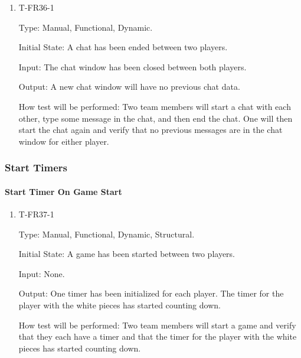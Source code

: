 \documentclass[12pt, titlepage]{article}
\begin{document}
        \begin{enumerate}

        \item{T-FR36-1\\}

            Type: Manual, Functional, Dynamic.
            					
            Initial State: A chat has been ended between two players.
            					
            Input: The chat window has been closed between both players.
            					
            Output: A new chat window will have no previous chat data.

            How test will be performed: Two team members will start a chat with each other, type some message in the chat, and then end the chat. One will then start the chat again and verify that no previous messages are in the chat window for either player.

        \end{enumerate}

\subsubsection{Start Timers}
		
    \paragraph{Start Timer On Game Start}

        \begin{enumerate}

        \item{T-FR37-1\\}

            Type: Manual, Functional, Dynamic, Structural.
            					
            Initial State: A game has been started between two players.
            					
            Input: None.
            					
            Output: One timer has been initialized for each player. The timer for the player with the white pieces has started counting down.

            How test will be performed: Two team members will start a game and verify that they each have a timer and that the timer for the player with the white pieces has started counting down.

        \end{enumerate}
    
\end{document}

